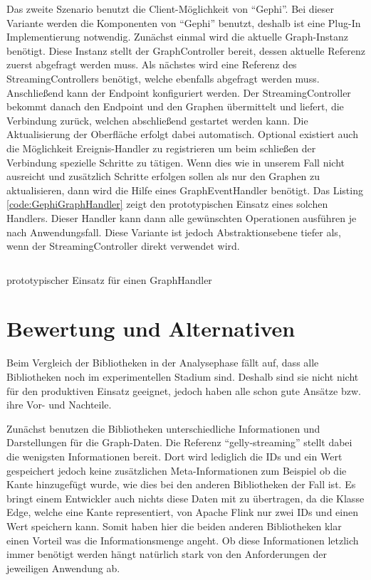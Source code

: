 Das zweite Szenario benutzt die Client-Möglichkeit von \enquote{Gephi}. Bei
dieser Variante werden die Komponenten von \enquote{Gephi} benutzt, deshalb
ist eine Plug-In Implementierung notwendig. Zunächst einmal wird die aktuelle
Graph-Instanz benötigt. Diese Instanz stellt der GraphController bereit, dessen
aktuelle Referenz zuerst abgefragt werden muss. Als nächstes wird eine Referenz
des StreamingControllers benötigt, welche ebenfalls abgefragt werden muss.
Anschließend kann der Endpoint konfiguriert werden. Der StreamingController
bekommt danach den Endpoint und den Graphen übermittelt und liefert, die
Verbindung zurück, welchen abschließend gestartet werden kann. Die Aktualisierung
der Oberfläche erfolgt dabei automatisch. Optional existiert auch die Möglichkeit
Ereignis-Handler zu registrieren um beim schließen der Verbindung spezielle
Schritte zu tätigen. Wenn dies wie in unserem Fall nicht ausreicht und zusätzlich
Schritte erfolgen sollen als nur den Graphen zu aktualisieren, dann wird die
Hilfe eines GraphEventHandler benötigt. Das Listing \ref{code:GephiGraphHandler}
zeigt den prototypischen Einsatz eines solchen Handlers. Dieser Handler kann dann
alle gewünschten Operationen ausführen je nach Anwendungsfall. Diese Variante ist
jedoch Abstraktionsebene tiefer als, wenn der StreamingController direkt
verwendet wird.

\begin{listing}
\inputminted[breaklines=true]{java}{../material/code/GephiGraphHandler.java}
\caption{prototypischer Einsatz für einen GraphHandler}
\label{code:GephiGraphHandler}
\end{listing}

\section{Bewertung und Alternativen}
Beim Vergleich der Bibliotheken in der Analysephase fällt auf, dass alle
Bibliotheken noch im experimentellen Stadium sind. Deshalb sind sie nicht nicht
für den produktiven Einsatz geeignet, jedoch haben alle schon gute Ansätze bzw.
ihre Vor- und Nachteile.

Zunächst benutzen die Bibliotheken unterschiedliche Informationen und Darstellungen
für die Graph-Daten. Die Referenz \enquote{gelly-streaming} stellt dabei die
wenigsten Informationen bereit. Dort wird lediglich die IDs und ein Wert
gespeichert jedoch keine zusätzlichen Meta-Informationen zum Beispiel ob die
Kante hinzugefügt wurde, wie dies bei den anderen Bibliotheken der Fall ist.
Es bringt einem Entwickler auch nichts diese Daten mit zu übertragen, da die
Klasse Edge, welche eine Kante representiert, von Apache Flink nur zwei IDs und
einen Wert speichern kann. Somit haben hier die beiden anderen Bibliotheken klar
einen Vorteil was die Informationsmenge angeht. Ob diese Informationen letzlich
immer benötigt werden hängt natürlich stark von den Anforderungen der jeweiligen
Anwendung ab.

